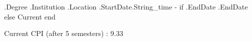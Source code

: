 \cventry
{ {{.Degree}} } %
{ {{.Institution }} } %
{ {{.Location}}} %
{ {{.StartDate.String_time }} - {{if .EndDate}} {{.EndDate}} {{else}} Current {{end}}} %
{
    \begin{cvitems} %
        \item {Current CPI (after 5 semesters) : 9.33}
    \end{cvitems}
}